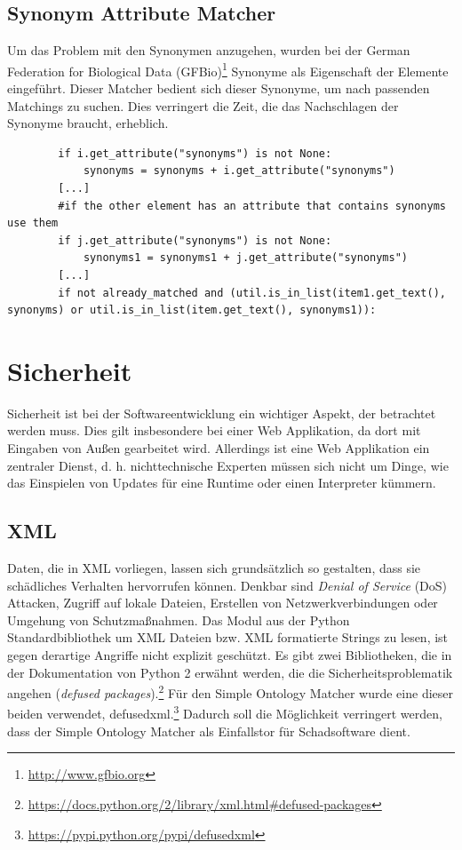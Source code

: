 		\subsection{Synonym Attribute Matcher}
		Um das Problem mit den Synonymen anzugehen, wurden bei der German Federation
		for Biological Data (GFBio)\footnote{\url{http://www.gfbio.org}} Synonyme als
		Eigenschaft der Elemente eingeführt. Dieser Matcher bedient sich dieser
		Synonyme, um nach passenden Matchings zu suchen. Dies verringert die Zeit, die
		das Nachschlagen der Synonyme braucht, erheblich.
		\begin{lstlisting}
		if i.get_attribute("synonyms") is not None:
            synonyms = synonyms + i.get_attribute("synonyms")
        [...]
        #if the other element has an attribute that contains synonyms use them
        if j.get_attribute("synonyms") is not None:
            synonyms1 = synonyms1 + j.get_attribute("synonyms")
        [...]
        if not already_matched and (util.is_in_list(item1.get_text(), synonyms) or util.is_in_list(item.get_text(), synonyms1)):
		\end{lstlisting}
		
		\section{Sicherheit}
		\label{Sicherheit}
		Sicherheit ist bei der Softwareentwicklung ein wichtiger Aspekt, der
		betrachtet werden muss. Dies gilt insbesondere bei einer Web Applikation, da
		dort mit Eingaben von Außen gearbeitet wird. Allerdings ist eine Web
		Applikation ein zentraler Dienst, d. h. nichttechnische Experten müssen sich
		nicht um Dinge, wie das Einspielen von Updates für eine Runtime oder einen
		Interpreter kümmern.
		
		\subsection{XML}
		Daten, die in XML vorliegen, lassen sich grundsätzlich so gestalten, dass sie
		schädliches Verhalten hervorrufen können. Denkbar sind
		\textit{Denial of Service} (DoS) Attacken, Zugriff auf lokale Dateien,
		Erstellen von Netzwerkverbindungen oder Umgehung von
		Schutzmaßnahmen.\cite{defusedxml}
		Das Modul aus der Python Standardbibliothek um XML Dateien bzw. XML
		formatierte Strings zu lesen, ist gegen derartige Angriffe nicht explizit
		geschützt. Es gibt zwei Bibliotheken, die in der Dokumentation von Python 2
		erwähnt werden, die die Sicherheitsproblematik angehen (\textit{defused
		packages}).\footnote{\url{https://docs.python.org/2/library/xml.html#defused-packages}}
		Für den Simple Ontology Matcher wurde eine dieser beiden verwendet, defusedxml.\footnote{\url{https://pypi.python.org/pypi/defusedxml}} Dadurch
		soll die Möglichkeit verringert werden, dass der Simple Ontology Matcher als
		Einfallstor für Schadsoftware dient.
		
